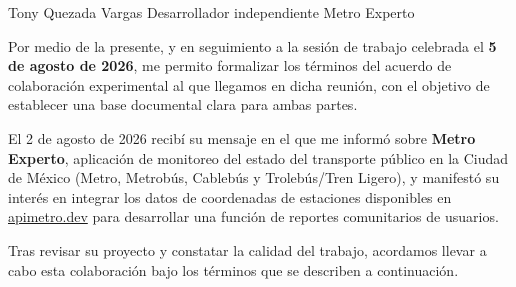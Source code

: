 
\DatosDestinatario
  {Tony Quezada Vargas}
  {Desarrollador independiente}
  {Metro Experto}



Por medio de la presente, y en seguimiento a la sesión de trabajo celebrada el
\textbf{5 de agosto de 2026}, me permito formalizar los términos del acuerdo de
colaboración experimental al que llegamos en dicha reunión, con el objetivo de
establecer una base documental clara para ambas partes.


El 2 de agosto de 2026 recibí su mensaje en el que me informó sobre
\textbf{Metro Experto}, aplicación de monitoreo del estado del transporte
público en la Ciudad de México (Metro, Metrobús, Cablebús y Trolebús/Tren
Ligero), y manifestó su interés en integrar los datos de coordenadas de
estaciones disponibles en \href{https://apimetro.dev}{apimetro.dev} para
desarrollar una función de reportes comunitarios de usuarios.

Tras revisar su proyecto y constatar la calidad del trabajo, acordamos llevar
a cabo esta colaboración bajo los términos que se describen a continuación.


